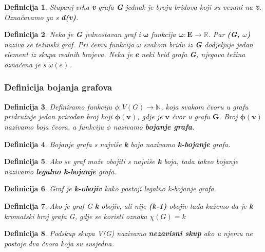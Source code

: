 \documentclass[times, utf8, diplomski, numeric]{fer}
\newtheorem{definition}{Definicija}
\begin{document}
\begin{definition}
Stupanj vrha \textbf{v} grafa \textbf{G} jednak je broju bridova koji su vezani na \textbf{v}. Označavamo ga s \textbf{d(v)}.
\end{definition}

\begin{definition}
Neka je \textbf{G} jednostavan graf i $\mathbf{\omega}$ funkcija $\mathbf{\omega : E \rightarrow \mathbb{R}}$. Par \textbf{(G, $\omega$)} naziva se težinski graf. Pri čemu funkcija $\omega$ svakom bridu iz \textbf{G} dodjeljuje jedan element iz skupa realnih brojeva. Neka je \textbf{e} neki brid grafa \textbf{G}, njegova težina označena je s $\omega(\mathbf{\mathit{e}})$.	 
\end{definition}


\subsubsection{Definicija bojanja grafova}

\begin{definition}
Definiramo funkciju $\phi : V(G) \rightarrow \mathbb{N}$, koja svakom čvoru u grafu pridružuje jedan prirodan broj koji $\mathbf{\phi(v)}$, gdje je $\mathbf{v}$ čvor u grafu $\mathbf{G}$. Broj $\mathbf{\phi(v)}$ nazivamo boja čvora, a funkciju $\phi$ nazivamo \textbf{bojanje grafa}. 
\end{definition}

\begin{definition}
Bojanje grafa s najviše \textbf{k} boja nazivamo \textbf{k-bojanje} grafa. 
\end{definition}

\begin{definition}
Ako se graf može obojiti s najviše \textbf{k} boja, tada takvo bojanje nazivamo \textbf{legalno k-bojanje} grafa. 
\end{definition}

\begin{definition}
Graf je \textbf{k-obojiv} kako postoji legalno k-bojanje grafa.
\end{definition}


\begin{definition}
Ako je graf G \textbf{k}-obojiv, ali nije \textbf{(k-1)}-obojiv tada kažemo da je \textbf{k} kromatski broj grafa G, gdje se koristi oznaka $\chi(G)=k$  
\end{definition}


\begin{definition}
Podskup skupa V(G) nazivamo \textbf{nezavisni skup} ako u njemu ne postoje dva čvora koja su susjedna.  
\end{definition}
\end{document}
